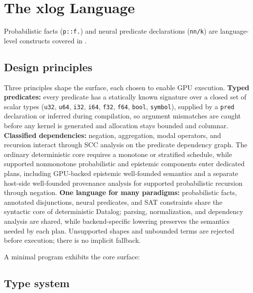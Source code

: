 \section{The xlog Language}\label{sec:lang}

Probabilistic facts (\texttt{p::f.}) and neural predicate declarations (\texttt{nn/k}) are language-level constructs covered in .

\subsection{Design principles}

Three principles shape the surface, each chosen to enable GPU execution. \textbf{Typed predicates:} every predicate has a statically known signature over a closed set of scalar types (\texttt{u32}, \texttt{u64}, \texttt{i32}, \texttt{i64}, \texttt{f32}, \texttt{f64}, \texttt{bool}, \texttt{symbol}), supplied by a \texttt{pred} declaration or inferred during compilation, so argument mismatches are caught before any kernel is generated and allocation stays bounded and columnar. \textbf{Classified dependencies:} negation, aggregation, modal operators, and recursion interact through SCC analysis on the predicate dependency graph. The ordinary deterministic core requires a monotone or stratified schedule, while supported nonmonotone probabilistic and epistemic components enter dedicated plans, including GPU-backed epistemic well-founded semantics and a separate host-side well-founded provenance analysis for supported probabilistic recursion through negation. \textbf{One language for many paradigms:} probabilistic facts, annotated disjunctions, neural predicates, and SAT constraints share the syntactic core of deterministic Datalog; parsing, normalization, and dependency analysis are shared, while backend-specific lowering preserves the semantics needed by each plan. Unsupported shapes and unbounded terms are rejected before execution; there is no implicit fallback.

A minimal program exhibits the core surface:



\subsection{Type system}\label{sec:lang:types}

